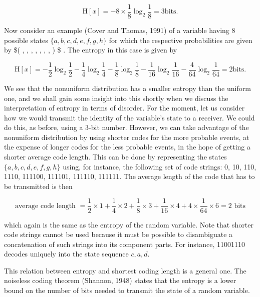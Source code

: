 \documentclass[
  10
]{article}
\begin{document}
\[
\mathrm{H} [ x ] = - 8 \times \frac {1}{8} \log_ {2} {\frac {1}{8}} = 3 \mathrm{bits}.
\]

Now consider an example (Cover and Thomas, 1991) of a variable having 8
possible states \(\{ a , b , c , d , e , f , g , h \}\) for which the
respective probabilities are given by \$(
 ,  ,
 ,  ,
 , 
,  ,
 ) \$ . The entropy in this case is
given by

\[
\mathrm{H} [ x ] = - \frac {1}{2} \log_ {2} \frac {1}{2} - \frac {1}{4} \log_ {2} \frac {1}{4} - \frac {1}{8} \log_ {2} \frac {1}{8} - \frac {1}{1 6} \log_ {2} \frac {1}{1 6} - \frac {4}{6 4} \log_ {2} \frac {1}{6 4} = 2 \text {bits.}
\]

We see that the nonuniform distribution has a smaller entropy than the
uniform one, and we shall gain some insight into this shortly when we
discuss the interpretation of entropy in terms of disorder. For the
moment, let us consider how we would transmit the identity of the
variable's state to a receiver. We could do this, as before, using a
3-bit number. However, we can take advantage of the nonuniform
distribution by using shorter codes for the more probable events, at the
expense of longer codes for the less probable events, in the hope of
getting a shorter average code length. This can be done by representing
the states \(\{ a , b , c , d , e , f , g , h \}\) using, for instance,
the following set of code strings: 0, 10, 110, 1110, 111100, 111101,
111110, 111111. The average length of the code that has to be
transmitted is then

\[
\text { average   code   length } = \frac {1}{2} \times 1 + \frac {1}{4} \times 2 + \frac {1}{8} \times 3 + \frac {1}{1 6} \times 4 + 4 \times \frac {1}{6 4} \times 6 = 2 \text { bits }
\]

which again is the same as the entropy of the random variable. Note that
shorter code strings cannot be used because it must be possible to
disambiguate a concatenation of such strings into its component parts.
For instance, 11001110 decodes uniquely into the state sequence
\(c , a , d .\)

This relation between entropy and shortest coding length is a general
one. The noiseless coding theorem (Shannon, 1948) states that the
entropy is a lower bound on the number of bits needed to transmit the
state of a random variable.
\end{document}
